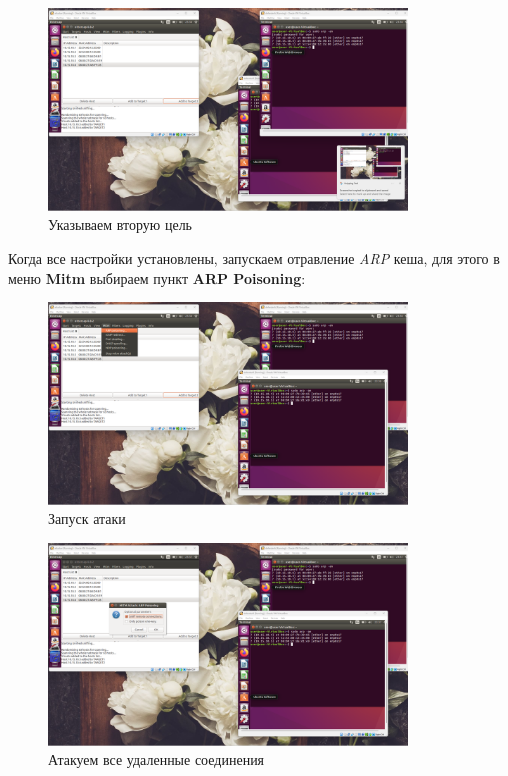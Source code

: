\documentclass[a4paper]{article}
\begin{document}
  \begin{figure}[H]
    \centering
    \includegraphics[width=0.85\textwidth]{02_00 (54)}
    \caption{Указываем вторую цель}
    \label{img:0041}
  \end{figure}

  Когда все настройки установлены, запускаем отравление \textit{ARP} кеша,
  для этого в меню \textbf{Mitm} выбираем пункт \textbf{ARP Poisoning}:

  \begin{figure}[H]
    \centering
    \includegraphics[width=0.85\textwidth]{02_00 (55)}
    \caption{Запуск атаки}
    \label{img:0042}
  \end{figure}

  \begin{figure}[H]
    \centering
    \includegraphics[width=0.85\textwidth]{02_00 (56)}
    \caption{Атакуем все удаленные соединения}
    \label{img:0043}
  \end{figure}
\end{document}
